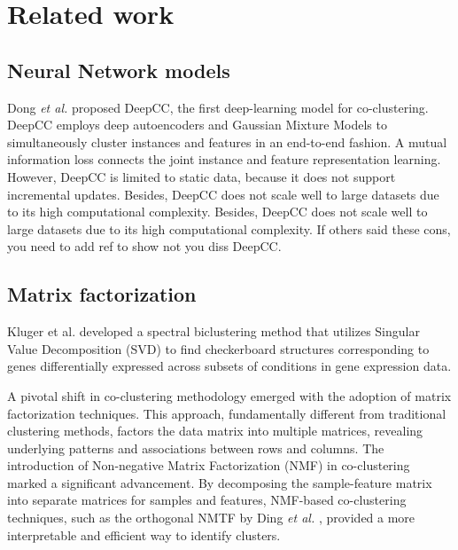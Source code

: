 

\section{Related work}
\subsection{Neural Network models}
Dong \textit{et al.}\cite{dongkuanxu2019DeepCoClustering} proposed DeepCC, the first deep-learning model for co-clustering. DeepCC employs deep autoencoders and Gaussian Mixture Models to simultaneously cluster instances and features in an end-to-end fashion. A mutual information loss connects the joint instance and feature representation learning. {\color{blue} However, DeepCC is limited to static data, because it does not support incremental updates. Besides, DeepCC does not scale well to large datasets due to its high computational complexity.
Besides, DeepCC does not scale well to large datasets due to its high computational complexity.
If others said these cons, you need to add ref to show not you diss DeepCC}.

\subsection{Matrix factorization}
Kluger et al. \cite{kluger2003SpectralBiclusteringMicroarray} developed a spectral biclustering method that utilizes Singular Value Decomposition (SVD) to find checkerboard structures corresponding to genes differentially expressed across subsets of conditions in gene expression data.   

A pivotal shift in co-clustering methodology emerged with the adoption of matrix factorization techniques. This approach, fundamentally different from traditional clustering methods, factors the data matrix into multiple matrices, revealing underlying patterns and associations between rows and columns. The introduction of Non-negative Matrix Factorization (NMF) in co-clustering marked a significant advancement. By decomposing the sample-feature matrix into separate matrices for samples and features, NMF-based co-clustering techniques, such as the orthogonal NMTF by Ding \textit{et al.} \cite{ding2006OrthogonalNonnegativeMatrix}, provided a more interpretable and efficient way to identify clusters. 

